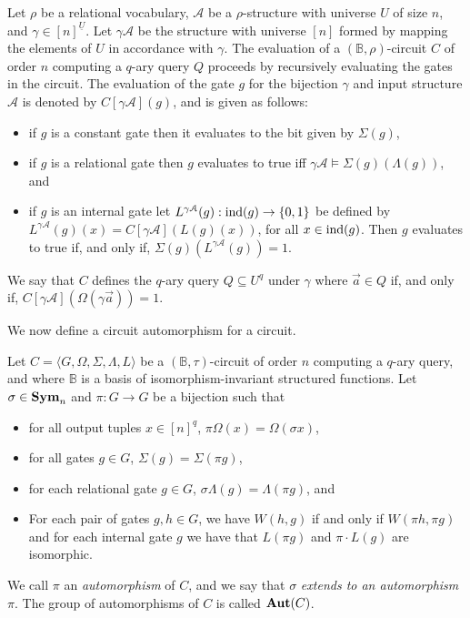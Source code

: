 \documentclass[a4paper,UKenglish]{lipics-v2018}
\begin{document}
Let $\rho$ be a relational vocabulary, $\mathcal{A}$ be a $\rho$-structure with
universe $U$ of size $n$, and $\gamma \in [n]^{\underline{U}}$. Let $\gamma
\mathcal{A}$ be the structure with universe $[n]$ formed by mapping the elements
of $U$ in accordance with $\gamma$. The evaluation of a $(\mathbb{B},
\rho)$-circuit $C$ of order $n$ computing a $q$-ary query $Q$ proceeds by
recursively evaluating the gates in the circuit. The evaluation of the gate $g$
for the bijection $\gamma$ and input structure $\mathcal{A}$ is denoted by
$C[\gamma \mathcal{A}](g)$, and is given as follows:

\begin{itemize}
\item if $g$ is a constant gate then it evaluates to the bit given by
  $\Sigma(g)$,
\item if $g$ is a relational gate then $g$ evaluates to true iff $\gamma
  \mathcal{A} \models \Sigma(g)(\Lambda (g))$, and
\item if $g$ is an internal gate let $L^{\gamma \mathcal{A}}(g): \text{\upshape ind}(g)
  \rightarrow \{0,1\}$ be defined by $L^{\gamma\mathcal{A}}(g)(x) = C[\gamma
  \mathcal{A}](L(g)(x))$, for all $x \in \text{\upshape ind}(g)$. Then $g$ evaluates to true
  if, and only if, $\Sigma(g) (L^{\gamma \mathcal{A}}(g)) = 1$.
\end{itemize}

We say that $C$ defines the $q$-ary query $Q \subseteq U^q$ under $\gamma$ where
$\vec{a} \in Q$ if, and only if, $C[\gamma \mathcal{A}](\Omega (\gamma \vec{a}))
= 1$.

We now define a circuit automorphism for a circuit.

\begin{definition}[Automorphism]\label{defn:automorphism}
  Let $C = \langle G, \Omega, \Sigma, \Lambda, L\rangle$ be a
  $(\mathbb{B},\tau)$-circuit of order $n$ computing a $q$-ary query, and where
  $\mathbb{B}$ is a basis of isomorphism-invariant structured functions. Let
  $\sigma \in \text{\textbf{Sym}}_n$ and $\pi: G \rightarrow G$ be a bijection such that
  \begin{itemize}
  \item for all output tuples $x \in [n]^q$, $\pi \Omega (x) = \Omega (\sigma
    x)$,
  \item for all gates $g \in G$, $\Sigma (g) = \Sigma (\pi g)$,
  \item for each relational gate $g \in G$, $\sigma \Lambda (g) = \Lambda (\pi
    g)$, and
  \item For each pair of gates $g, h \in G$, we have $W(h,g)$ if and only if
    $W(\pi h, \pi g)$ and for each internal gate $g$ we have that $L(\pi g)$ and
    $ \pi \cdot L(g)$ are isomorphic.
  \end{itemize}
  We call $\pi$ an \emph{automorphism} of $C$, and we say that $\sigma$
  \emph{extends to an automorphism} $\pi$. The group of automorphisms of $C$ is
  called $\text{\textbf{Aut}} (C)$.
\end{definition}
\end{document}
